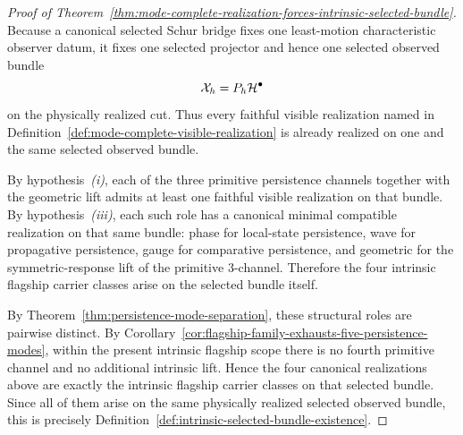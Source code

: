 \begin{proof}[Proof of Theorem~\ref{thm:mode-complete-realization-forces-intrinsic-selected-bundle}]
\label{proof:thm:mode-complete-realization-forces-intrinsic-selected-bundle}
Because a canonical selected Schur bridge fixes one least-motion characteristic
observer datum, it fixes one selected projector and hence one selected observed
bundle
\[
\mathcal X_h=P_h\mathcal{H}^\bullet
\]
on the physically realized cut. Thus every faithful visible realization named
in Definition~\ref{def:mode-complete-visible-realization} is already realized
on one and the same selected observed bundle.

By hypothesis~\emph{(i)}, each of the three primitive persistence channels
together with the geometric lift admits at least one faithful visible
realization on that bundle. By hypothesis~\emph{(iii)}, each such role has a
canonical minimal compatible realization on that same bundle: phase for
local-state persistence, wave for propagative persistence, gauge for
comparative persistence, and geometric for the symmetric-response lift of the
primitive \(3\)-channel. Therefore the four intrinsic flagship carrier classes
arise on the selected bundle itself.

By Theorem~\ref{thm:persistence-mode-separation}, these structural roles are
pairwise distinct. By
Corollary~\ref{cor:flagship-family-exhausts-five-persistence-modes}, within the
present intrinsic flagship scope there is no fourth primitive channel and no
additional intrinsic lift. Hence the four canonical realizations above are
exactly the intrinsic flagship carrier classes on that selected bundle. Since
all of them arise on the same physically realized selected observed bundle,
this is precisely
Definition~\ref{def:intrinsic-selected-bundle-existence}.
\end{proof}

